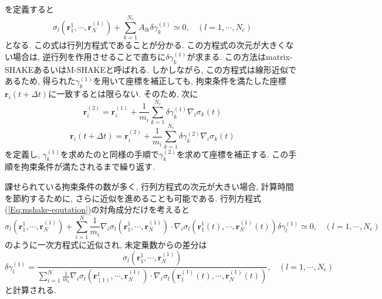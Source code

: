を定義すると
\begin{equation}
    \sigma_{l}(\bm{r}_{1}^{1}, \cdots, \bm{r}_{N}^{(1)}) + \sum_{k=1}^{N_{\mathrm{c}}} A_{lk}  \delta \gamma_{k}^{(1)} \simeq 0, ~~~~ (l = 1,\cdots,N_{\mathrm{c}})
    \label{Eq:mshake-equtation}
\end{equation}
となる. 
この式は行列方程式であることが分かる. 
この方程式の次元が大きくない場合は, 逆行列を作用させることで直ちに$\delta \gamma_{k}^{(1)}$が求まる. 
この方法はmatrix-SHAKEあるいはM-SHAKEと呼ばれる\cite{2001Krautler}. 
しかしながら, この方程式は線形近似であるため, 得られた$\gamma_{k}^{(1)}$を用いて座標を補正しても, 拘束条件を満たした座標$\bm{r}_{i}(t + \Delta t)$に一致するとは限らない. 
そのため, 次に
\begin{equation}
    \bm{r}_{i}^{(2)} =
    \bm{r}_{i}^{(1)} + \frac{1}{m_{i}} \sum_{k=1}^{N_{\mathrm{c}}} \delta \gamma_{k}^{(1)} \nabla_{i} \sigma_{k}(t)
\end{equation}
\begin{equation}
    \bm{r}_{i} (t + \Delta t) =
    \bm{r}_{i}^{(2)} + \frac{1}{m_{i}} \sum_{k=1}^{N_{\mathrm{c}}} \delta \gamma_{k}^{(2)} \nabla_{i} \sigma_{k}(t)
\end{equation}
を定義し, $\gamma_{k}^{(1)}$を求めたのと同様の手順で$\gamma_{k}^{(2)}$を求めて座標を補正する. 
この手順を拘束条件が満たされるまで繰り返す. 

課せられている拘束条件の数が多く, 行列方程式の次元が大きい場合, 計算時間を節約するために, さらに近似を進めることも可能である. 
行列方程式(\ref{Eq:mshake-equtation})の対角成分だけを考えると
\begin{equation}
    \sigma_{l}(\bm{r}_{1}^{1}, \cdots, \bm{r}_{N}^{(1)}) +
    \sum_{i=1}^{N}  \frac{1}{m_{i}}
    \nabla_{i} \sigma_{l} (\bm{r}_{1}^{1}, \cdots, \bm{r}_{N}^{(1)}) \cdot
    \nabla_{i} \sigma_{l} (\bm{r}_{1}^{1}(t), \cdots, \bm{r}_{N}^{(1)}(t))
    \delta \gamma_{l}^{(1)}
    \simeq 0, ~~~~ (l = 1,\cdots,N_{\mathrm{c}})
\end{equation}
のように一次方程式に近似され, 未定乗数からの差分は
\begin{equation}
    \delta \gamma_{l}^{(1)} =
    \frac{\sigma_{l} (\bm{r}_{1}^{1}, \cdots, \bm{r}_{N}^{(1)})}{\sum_{i=1}^{N} \frac{1}{m_{i}} \nabla_{i} \sigma_{l} (\bm{r}_{(1)}^{1}, \cdots, \bm{r}_{N}^{(1)}) \cdot \nabla_{i} \sigma_{l} (\bm{r}_{1}^{(1)}(t), \cdots, \bm{r}_{N}^{(1)}(t))}
    ,~~~~
    (l = 1,\cdots,N_{\mathrm{c}})
\end{equation}
と計算される. 


